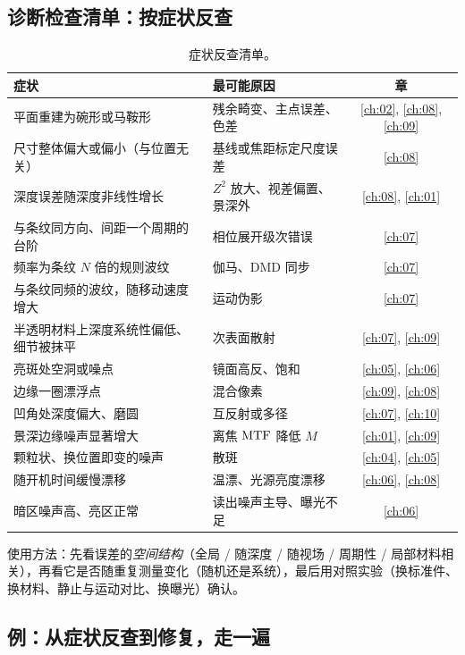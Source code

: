 \subsection{诊断检查清单：按症状反查}

\begin{table}[htbp]
  \centering
  \small
  \begin{tabular}{@{}p{}p{}c@{}}
    \toprule
    症状 & 最可能原因 & 章 \\
    \midrule
    平面重建为碗形或马鞍形 & 残余畸变、主点误差、色差 & \ref{ch:02}, \ref{ch:08}, \ref{ch:09} \\
    尺寸整体偏大或偏小（与位置无关） & 基线或焦距标定尺度误差 & \ref{ch:08} \\
    深度误差随深度非线性增长 & $Z^2$ 放大、视差偏置、景深外 & \ref{ch:08}, \ref{ch:01} \\
    与条纹同方向、间距一个周期的台阶 & 相位展开级次错误 & \ref{ch:07} \\
    频率为条纹 $N$ 倍的规则波纹 & 伽马、DMD 同步 & \ref{ch:07} \\
    与条纹同频的波纹，随移动速度增大 & 运动伪影 & \ref{ch:07} \\
    半透明材料上深度系统性偏低、细节被抹平 & 次表面散射 & \ref{ch:07}, \ref{ch:09} \\
    亮斑处空洞或噪点 & 镜面高反、饱和 & \ref{ch:05}, \ref{ch:06} \\
    边缘一圈漂浮点 & 混合像素 & \ref{ch:09}, \ref{ch:08} \\
    凹角处深度偏大、磨圆 & 互反射或多径 & \ref{ch:07}, \ref{ch:10} \\
    景深边缘噪声显著增大 & 离焦 $\mathrm{MTF}$ 降低 $M$ & \ref{ch:01}, \ref{ch:09} \\
    颗粒状、换位置即变的噪声 & 散斑 & \ref{ch:04}, \ref{ch:05} \\
    随开机时间缓慢漂移 & 温漂、光源亮度漂移 & \ref{ch:06}, \ref{ch:08} \\
    暗区噪声高、亮区正常 & 读出噪声主导、曝光不足 & \ref{ch:06} \\
    \bottomrule
  \end{tabular}
  \caption{症状反查清单。}
  \label{tab:ch11-checklist}
\end{table}

使用方法：先看误差的\emph{空间结构}（全局 / 随深度 / 随视场 / 周期性 / 局部材料相关），再看它是否随重复测量变化（随机还是系统），最后用对照实验（换标准件、换材料、静止与运动对比、换曝光）确认。

\subsection{例：从症状反查到修复，走一遍}

